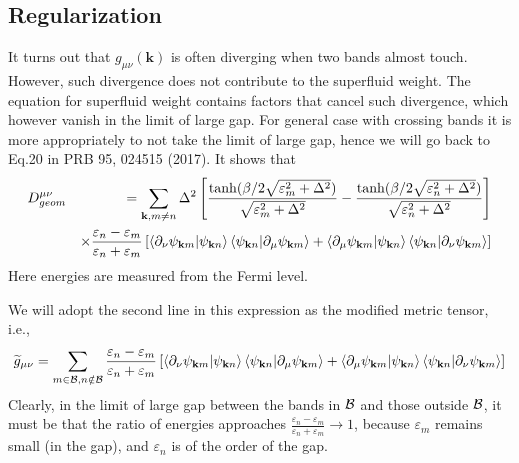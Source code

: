 \documentclass[onecolumn, prb,preprintnumbers,amsmath,amssymb,floatfix]{revtex4}
\newcommand{\vk}{{\mathbf{k}}}
\newcommand{\cb}{{\cal B}}
\begin{document}
\subsection{Regularization}

It turns out that $g_{\mu\nu}(\vk)$ is often diverging when two bands
almost touch. However, such divergence does not contribute to the
superfluid weight. The equation for superfluid weight contains factors
that cancel such divergence, which however vanish in the limit of
large gap. For general case with crossing bands it is more
appropriately to not take the limit of large gap, hence we will go
back to Eq.20 in PRB 95, 024515 (2017). It shows that
\begin{eqnarray}
  D^{\mu\nu}_{geom}  &&=\sum_{\vk,m\ne n}
  \Delta^2\left[\frac{\tanh(\beta/2
                        \sqrt{\varepsilon_m^2+\Delta^2})}{\sqrt{\varepsilon_m^2+\Delta^2}}-\frac{\tanh(\beta/2
                        \sqrt{\varepsilon_n^2+\Delta^2})}{\sqrt{\varepsilon_n^2+\Delta^2}}
  \right]
  \nonumber\\
  &&\times\frac{\varepsilon_n-\varepsilon_m}{\varepsilon_n+\varepsilon_m}
%
     \left[\braket{\partial_\nu\psi_{\vk m}|\psi_{\vk n}}\braket{\psi_{\vk n}|\partial_\mu \psi_{\vk m}}
   +\braket{\partial_\mu \psi_{\vk m}|\psi_{\vk n}}\braket{\psi_{\vk n}|\partial_\nu \psi_{\vk m}}\right]
\end{eqnarray}
Here energies are measured from the Fermi level.

We will adopt the second line in this expression as the modified
metric tensor, i.e.,
\begin{eqnarray}
\widetilde{g}_{\mu\nu}=  \sum_{m\in\cb,n\notin\cb}\frac{\varepsilon_n-\varepsilon_m}{\varepsilon_n+\varepsilon_m}
    \left[ \braket{\partial_\nu\psi_{\vk m}|\psi_{\vk n}}\braket{\psi_{\vk n}|\partial_\mu \psi_{\vk m}}
   +\braket{\partial_\mu \psi_{\vk m}|\psi_{\vk n}}\braket{\psi_{\vk n}|\partial_\nu \psi_{\vk m}}\right]
\end{eqnarray}  
Clearly, in the limit of large gap between the bands in $\cb$ and
those outside $\cb$, it must be that the ratio of energies approaches
$\frac{\varepsilon_n-\varepsilon_m}{\varepsilon_n+\varepsilon_m}\rightarrow
1$, because $\varepsilon_m$ remains small (in the gap), and $\varepsilon_n$
is of the order of the gap.
\end{document}
